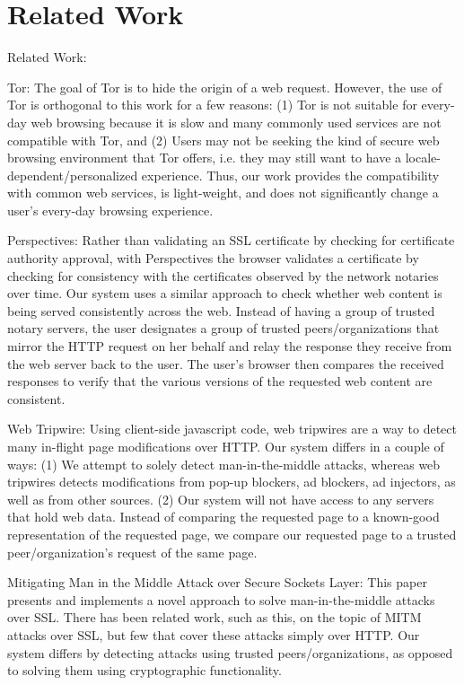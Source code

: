 \section{Related Work}
\label{sec:related}

Related Work:

Tor: The goal of Tor is to hide the origin of a web request. However, the use of Tor is orthogonal to this work for a few reasons: (1) Tor is not suitable for every-day web browsing because it is slow and many commonly used services are not compatible with Tor, and (2) Users may not be seeking the kind of secure web browsing environment that Tor offers, i.e. they may still want to have a locale-dependent/personalized experience. Thus, our work provides the compatibility with common web services, is light-weight, and does not significantly change a user’s every-day browsing experience.

Perspectives: Rather than validating an SSL certificate by checking for certificate authority approval, with Perspectives the browser validates a certificate by checking for consistency with the certificates observed by the network notaries over time. Our system uses a similar approach to check whether web content is being served consistently across the web. Instead of having a group of trusted notary servers, the user designates a group of trusted peers/organizations that mirror the HTTP request on her behalf and relay the response they receive from the web server back to the user. The user’s browser then compares the received responses to verify that the various versions of the requested web content are consistent.            
                                                   
Web Tripwire: Using client-side javascript code, web tripwires are a way to detect many in-flight page modifications over HTTP.  Our system differs in a couple of ways: (1) We attempt to solely detect man-in-the-middle attacks, whereas web tripwires detects modifications from pop-up blockers, ad blockers, ad injectors, as well as from other sources. (2) Our system will not have access to any servers that hold web data.  Instead of comparing the requested page to a known-good representation of the requested page, we compare our requested page to a trusted peer/organization’s request of the same page.  

Mitigating Man in the Middle Attack over Secure Sockets Layer: This paper presents and implements a novel approach to solve man-in-the-middle attacks over SSL.  There has been related work, such as this, on the topic of MITM attacks over SSL, but few that cover these attacks simply over HTTP.  Our system differs by detecting attacks using trusted peers/organizations, as opposed to solving them using cryptographic functionality.
